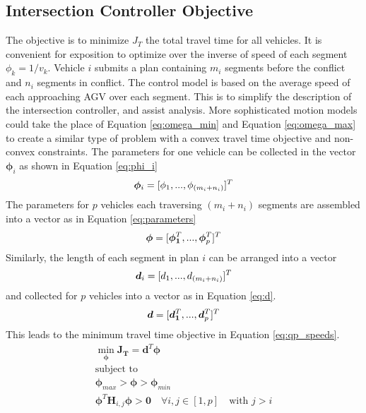 \subsection{Intersection Controller Objective}
The objective is to minimize $J_T$ the total travel time for all vehicles. It is convenient for exposition to optimize over the inverse of speed of each segment $\phi_k = 1/v_k$. Vehicle $i$ submits a plan containing $m_i$ segments before the conflict and $n_i$ segments in conflict. The control model is based on the average speed of each approaching AGV over each segment. This is to simplify the description of the intersection controller, and assist analysis. More sophisticated motion models could take the place of  Equation \ref{eq:omega_min} and  Equation \ref{eq:omega_max} to create a similar type of problem with a convex travel time objective and non-convex constraints.   
The parameters for one vehicle can be collected in the vector $\bm{\phi}_i$ as shown in Equation \ref{eq:phi_i}
\begin{equation}
\bm{\phi}_i =  [\phi_{1}, ..., \phi_{(m_i + n_i)}]^T \\
\label{eq:phi_i}
\end{equation}
The parameters for $p$ vehicles each traversing $(m_i + n_i)$ segments are assembled into a vector as in Equation \ref{eq:parameters}
\begin{equation}
\bm{\phi} = [\bm{\phi_{1}}^T, ..., \bm{\phi}_{p}^T]^T \\
\label{eq:parameters}
\end{equation}
Similarly, the length of each segment in plan $i$ can be arranged into a vector 
\begin{equation}
\bm{d}_i = [d_{1}, ..., d_{(m_i + n_i)}]^T \\
\label{eq:d_i}
\end{equation}
and collected  for $p$ vehicles into a vector as in Equation \ref{eq:d}.
\begin{equation}
\bm{d} = [\bm{d_{1}}^T, ..., \bm{d}_{p}^T]^T \\
\label{eq:d}
\end{equation}
This leads to the minimum travel time objective in Equation \ref{eq:qp_speeds}. 
\begin{equation}
\begin{array}{c}
\min \limits_{\bm{\phi}} \bm{J_T} = \bm{d}^T \bm{\phi} \\
\textrm{subject to}\\
 \bm{\phi}_{max} > \bm{\phi} > \bm{\phi}_{min} \\
 \bm{\phi}^T\bm{H}_{i,j}\bm{\phi} > \bm{0} \quad \forall i,j \in [1,p] \quad \textrm{with } j>i \\
\end{array}
\label{eq:qp_speeds}
\end{equation}

